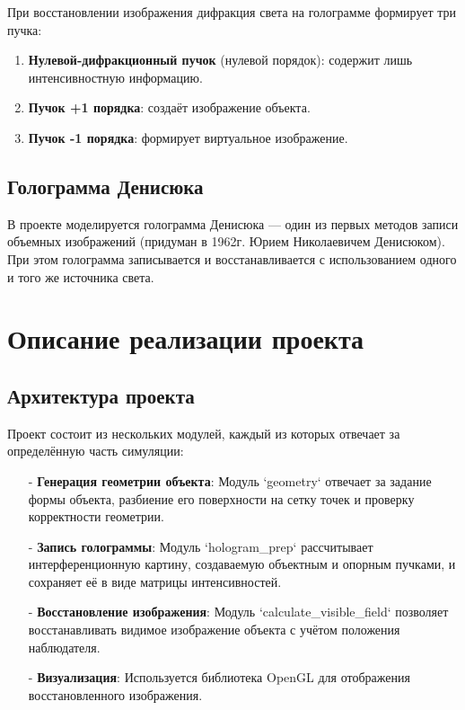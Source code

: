 \documentclass[aps,twocolumn,secnumarabic,balancelastpage,amsmath,amssymb,nofootinbib, floatfix]{revtex4-1}
\begin{document}
При восстановлении изображения дифракция света на голограмме формирует три пучка:  
\begin{enumerate}
	\item \textbf{Нулевой-дифракционный пучок} (нулевой порядок): содержит лишь интенсивностную информацию.  
	\item \textbf{Пучок +1 порядка}: создаёт изображение объекта.  
	\item \textbf{Пучок -1 порядка}: формирует виртуальное изображение.  
\end{enumerate}
\subsection{Голограмма Денисюка }

В проекте моделируется голограмма Денисюка — один из первых методов записи объемных изображений (придуман в 1962г. Юрием Николаевичем Денисюком). При этом голограмма записывается и восстанавливается с использованием одного и того же источника света.  

\section{Описание реализации проекта } 

\subsection{Архитектура проекта }

Проект состоит из нескольких модулей, каждый из которых отвечает за определённую часть симуляции:  
\begin{enumerate}
\item[-]\textbf{Генерация геометрии объекта}:  
Модуль `geometry` отвечает за задание формы объекта, разбиение его поверхности на сетку точек и проверку корректности геометрии.  

\item[-]\textbf{Запись голограммы}:  
Модуль `hologram\_prep` рассчитывает интерференционную картину, создаваемую объектным и опорным пучками, и сохраняет её в виде матрицы интенсивностей.  

\item[-]\textbf{Восстановление изображения}:  
Модуль `calculate\_visible\_field` позволяет восстанавливать видимое изображение объекта с учётом положения наблюдателя.  

\item[-]\textbf{Визуализация}:  
Используется библиотека OpenGL для отображения восстановленного изображения.  
\end{enumerate}
\end{document}
